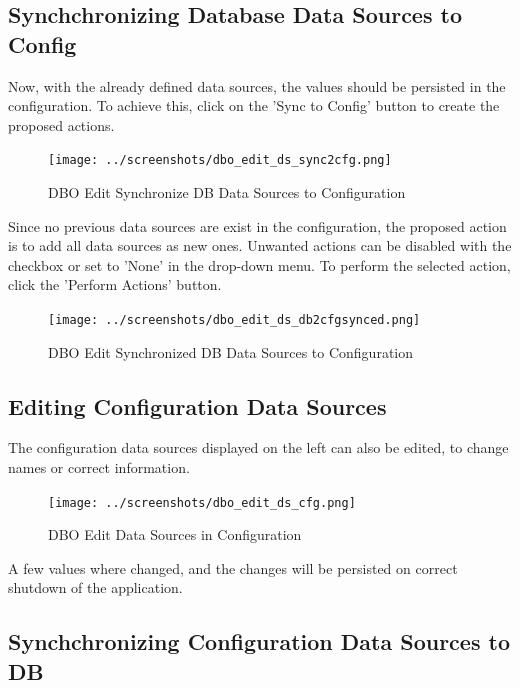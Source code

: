 {\subsection{Synchchronizing Database Data Sources to Config}

Now, with the already defined data sources, the values should be persisted in the configuration. To achieve this, click on the 'Sync to Config' button to create the proposed actions.

\begin{figure}[H]
  \hspace*{-2cm}
    \texttt{[image: ../screenshots/dbo\_edit\_ds\_sync2cfg.png]}
  \caption{DBO Edit Synchronize DB Data Sources to Configuration }
  \label{fig:dbo_edit_ds_sync2cfg}
\end{figure}

Since no previous data sources are exist in the configuration, the proposed action is to add all data sources as new ones. Unwanted actions can be disabled with the checkbox or set to 'None' in the drop-down menu. To perform the selected action, click the 'Perform Actions' button.

\begin{figure}[H]
  \hspace*{-2cm}
    \texttt{[image: ../screenshots/dbo\_edit\_ds\_db2cfgsynced.png]}
  \caption{DBO Edit Synchronized DB Data Sources to Configuration }
  \label{fig:dbo_edit_ds_db2cfgsynced}
\end{figure}

\subsection{Editing Configuration Data Sources}

The configuration data sources displayed on the left can also be edited, to change names or correct information.

\begin{figure}[H]
  \hspace*{-2cm}
    \texttt{[image: ../screenshots/dbo\_edit\_ds\_cfg.png]}
  \caption{DBO Edit Data Sources in Configuration}
  \label{fig:dbo_edit_ds_cfg}
\end{figure}

A few values where changed, and the changes will be persisted on correct shutdown of the application.

\subsection{Synchchronizing Configuration Data Sources to DB}

}
